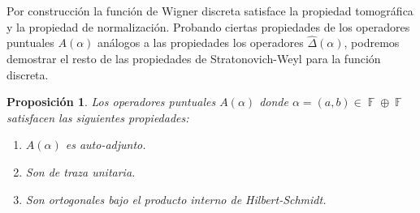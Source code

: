 \documentclass[a4paper,11pt]{report}
\DeclareMathOperator{\F}{\mathbb{F}}
\newtheorem{proposition}{Proposición}
\begin{document}
  Por construcción la función de Wigner discreta satisface
  la propiedad tomográfica y la propiedad de normalización.
  Probando ciertas propiedades de los operadores puntuales
  $A(\alpha)$ análogos a las propiedades los operadores
  $\hat \Delta(\alpha)$, podremos demostrar el resto de las
  propiedades de Stratonovich-Weyl para la función discreta.
  \begin{proposition}
    \label{prop:point_props}
    Los operadores puntuales $A(\alpha)$ donde $\alpha =
    (a,b) \in \F \oplus \F$ satisfacen las siguientes
    propiedades:
    \begin{enumerate}
      \item $A(\alpha)$ es auto-adjunto.
      \item Son de traza unitaria.
      \item Son ortogonales bajo el producto interno de
        Hilbert-Schmidt.
    \end{enumerate}
  \end{proposition}
\end{document}
